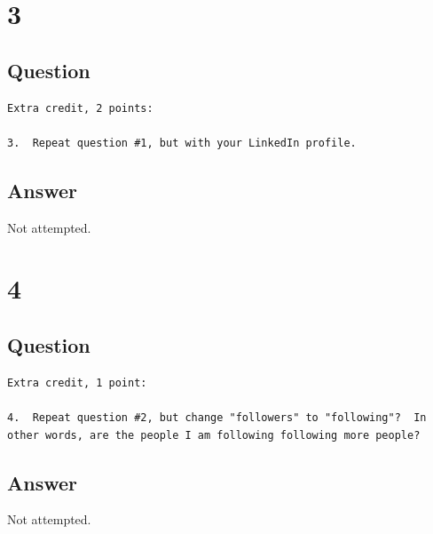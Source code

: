 \documentclass[letterpaper,11pt]{article}
\begin{document}
\newpage




\newpage
\section*{3}

\subsection*{Question}

\begin{verbatim}
Extra credit, 2 points:

3.  Repeat question #1, but with your LinkedIn profile.
\end{verbatim}

\newpage
\subsection*{Answer}

Not attempted.

\newpage
\section*{4}

\subsection*{Question}

\begin{verbatim}
Extra credit, 1 point:

4.  Repeat question #2, but change "followers" to "following"?  In
other words, are the people I am following following more people?
\end{verbatim}

\newpage
\subsection*{Answer}

Not attempted.


\clearpage


\end{document}
